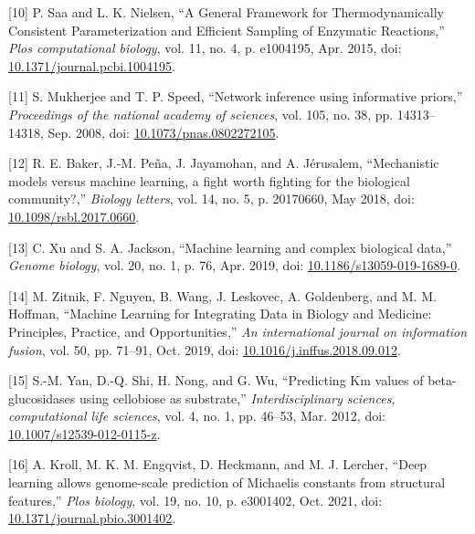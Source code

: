 \documentclass[11pt]{article}
\begin{document}
\hypertarget{citeproc_bib_item_10}{[10] P. Saa and L. K. Nielsen, “A General Framework for Thermodynamically Consistent Parameterization and Efficient Sampling of Enzymatic Reactions,” \textit{Plos computational biology}, vol. 11, no. 4, p. e1004195, Apr. 2015, doi: \href{https://doi.org/10.1371/journal.pcbi.1004195}{10.1371/journal.pcbi.1004195}.}

\hypertarget{citeproc_bib_item_11}{[11] S. Mukherjee and T. P. Speed, “Network inference using informative priors,” \textit{Proceedings of the national academy of sciences}, vol. 105, no. 38, pp. 14313–14318, Sep. 2008, doi: \href{https://doi.org/10.1073/pnas.0802272105}{10.1073/pnas.0802272105}.}

\hypertarget{citeproc_bib_item_12}{[12] R. E. Baker, J.-M. Peña, J. Jayamohan, and A. Jérusalem, “Mechanistic models versus machine learning, a fight worth fighting for the biological community?,” \textit{Biology letters}, vol. 14, no. 5, p. 20170660, May 2018, doi: \href{https://doi.org/10.1098/rsbl.2017.0660}{10.1098/rsbl.2017.0660}.}

\hypertarget{citeproc_bib_item_13}{[13] C. Xu and S. A. Jackson, “Machine learning and complex biological data,” \textit{Genome biology}, vol. 20, no. 1, p. 76, Apr. 2019, doi: \href{https://doi.org/10.1186/s13059-019-1689-0}{10.1186/s13059-019-1689-0}.}

\hypertarget{citeproc_bib_item_14}{[14] M. Zitnik, F. Nguyen, B. Wang, J. Leskovec, A. Goldenberg, and M. M. Hoffman, “Machine Learning for Integrating Data in Biology and Medicine: Principles, Practice, and Opportunities,” \textit{An international journal on information fusion}, vol. 50, pp. 71–91, Oct. 2019, doi: \href{https://doi.org/10.1016/j.inffus.2018.09.012}{10.1016/j.inffus.2018.09.012}.}

\hypertarget{citeproc_bib_item_15}{[15] S.-M. Yan, D.-Q. Shi, H. Nong, and G. Wu, “Predicting Km values of beta-glucosidases using cellobiose as substrate,” \textit{Interdisciplinary sciences, computational life sciences}, vol. 4, no. 1, pp. 46–53, Mar. 2012, doi: \href{https://doi.org/10.1007/s12539-012-0115-z}{10.1007/s12539-012-0115-z}.}

\hypertarget{citeproc_bib_item_16}{[16] A. Kroll, M. K. M. Engqvist, D. Heckmann, and M. J. Lercher, “Deep learning allows genome-scale prediction of Michaelis constants from structural features,” \textit{Plos biology}, vol. 19, no. 10, p. e3001402, Oct. 2021, doi: \href{https://doi.org/10.1371/journal.pbio.3001402}{10.1371/journal.pbio.3001402}.}
\end{document}
